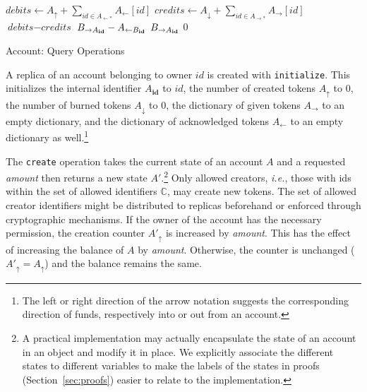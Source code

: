 \documentclass[9pt, oneside]{article}   	%
\begin{document}
\begin{algorithm}
\begin{algorithmic}[1]
    \State
        \State $\textit{debits} \leftarrow A_\uparrow + \sum\limits_{id \in A_{\leftarrow *}} A_{\leftarrow}[id]$ 
        \State $\textit{credits} \leftarrow A_\downarrow + \sum\limits_{id \in A_{\rightarrow *}} A_{\rightarrow}[id]$
        \State \Return $\textit{debits} - \textit{credits}$
    \EndFunction
    \State
        		\State \Return $B_{\rightarrow A_{\tiny\textbf{id}}} - A_{\leftarrow B_{\tiny\textbf{id}}}$
		\State \Return $B_{\rightarrow A_{\tiny\textbf{id}}}$
	\Else
		\State \Return $0$
	\EndIf
    \EndFunction
    \end{algorithmic}
\caption{\label{alg:account} Account: Query Operations}
\end{algorithm}

A replica of an account belonging to owner $id$ is created with \texttt{initialize}. This initializes the internal identifier $A_{\textbf{id}}$ to $id$, the number of created tokens $A_\uparrow$ to $0$, the number of burned tokens $A_\downarrow$ to $0$, the dictionary of given tokens $A_\rightarrow$ to an empty dictionary, and the dictionary of acknowledged tokens $A_\leftarrow$ to an empty dictionary as well.\footnote{The left or right direction of the arrow notation suggests the corresponding direction of funds, respectively into or out from an account.}

The \texttt{create} operation takes the current state of an account $A$ and a requested \textit{amount} then returns a new state $A'$.\footnote{A practical implementation may actually encapsulate the state of an account in an object and modify it in place. We explicitly associate the different states to different variables to make the labels of the states in proofs (Section~\ref{sec:proofs}) easier to relate to the implementation.} Only allowed creators, \textit{i.e.}, those with ids within the set of allowed identifiers $\mathds{C}$, may create new tokens. The set of allowed creator identifiers might be distributed to replicas beforehand or enforced through cryptographic mechanisms. If the owner of the account has the necessary permission, the creation counter $A'_\uparrow$ is increased by \textit{amount}. This has the effect of increasing the balance of $A$ by \textit{amount}. Otherwise, the counter is unchanged ($A'_\uparrow=A_\uparrow$) and the balance remains the same.
\end{document}
